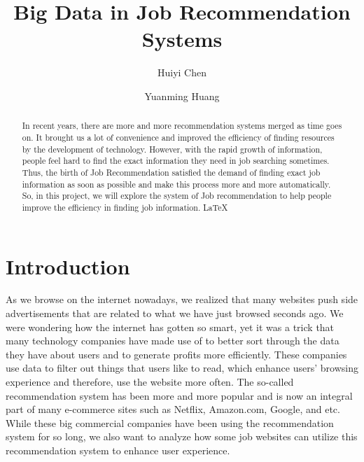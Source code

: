 \documentclass[sigconf]{acmart}
\begin{document}
\title{Big Data in Job Recommendation Systems}


\author{Huiyi Chen}



\author{Yuanming Huang}

\renewcommand{\shortauthors}{H. CHEN, Y. Huang}


\begin{abstract}
In recent years, there are more and more recommendation systems merged as time goes on. It brought us a lot of convenience and improved the efficiency of finding resources by the development of technology. However, with the rapid growth of information, people feel hard to find the exact information they need in job searching sometimes. Thus, the birth of Job Recommendation satisfied the demand of finding exact job information as soon as possible and make this process more and more automatically. So, in this project, we will explore the system of Job recommendation to help people improve the efficiency in finding job information.
\LaTeX\
\end{abstract}



\maketitle

\section{Introduction}

As we browse on the internet nowadays, we realized that many websites push side advertisements that are related to what we have just browsed seconds ago. We were wondering how the internet has gotten so smart, yet it was a trick that many technology companies have made use of to better sort through the data they have about users and to generate profits more efficiently. These companies use data to filter out things that users like to read, which enhance users' browsing experience and therefore, use the website more often.\cite{Standford} The so-called recommendation system has been more and more popular and is now an integral part of many e-commerce sites such as Netflix, Amazon.com, Google, and etc. While these big commercial companies have been using the recommendation system for so long, we also want to analyze how some job websites can utilize this recommendation system to enhance user experience. 
\end{document}
